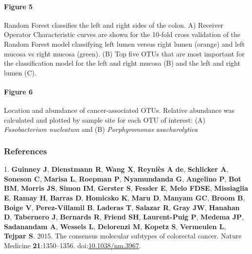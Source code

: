 \documentclass[11pt,]{article}
\let\oldparagraph\paragraph
\renewcommand{\paragraph}[1]{\oldparagraph{#1}\mbox{}}
\begin{document}
\newpage

\paragraph{Figure 5}\label{figure-5}

Random Forest classifies the left and right sides of the colon. A)
Receiver Operator Characteristic curves are shown for the 10-fold cross
validation of the Random Forest model classifying left lumen versus
right lumen (orange) and left mucosa vs right mucosa (green). (B) Top
five OTUs that are most important for the classification model for the
left and right mucosa (B) and the left and right lumen (C).

\newpage

\paragraph{Figure 6}\label{figure-6}

Location and abundance of cancer-associated OTUs. Relative abundance was
calculated and plotted by sample site for each OTU of interest: (A)
\emph{Fusobacterium nucleatum} and (B) \emph{Porphyromonas
asacharolytica}

\subsubsection*{References}\label{references}

\hypertarget{refs}{}
\hypertarget{ref-Guinney2015}{}
1. \textbf{Guinney J}, \textbf{Dienstmann R}, \textbf{Wang X},
\textbf{Reyniès A de}, \textbf{Schlicker A}, \textbf{Soneson C},
\textbf{Marisa L}, \textbf{Roepman P}, \textbf{Nyamundanda G},
\textbf{Angelino P}, \textbf{Bot BM}, \textbf{Morris JS}, \textbf{Simon
IM}, \textbf{Gerster S}, \textbf{Fessler E}, \textbf{Melo FDSE},
\textbf{Missiaglia E}, \textbf{Ramay H}, \textbf{Barras D},
\textbf{Homicsko K}, \textbf{Maru D}, \textbf{Manyam GC}, \textbf{Broom
B}, \textbf{Boige V}, \textbf{Perez-Villamil B}, \textbf{Laderas T},
\textbf{Salazar R}, \textbf{Gray JW}, \textbf{Hanahan D},
\textbf{Tabernero J}, \textbf{Bernards R}, \textbf{Friend SH},
\textbf{Laurent-Puig P}, \textbf{Medema JP}, \textbf{Sadanandam A},
\textbf{Wessels L}, \textbf{Delorenzi M}, \textbf{Kopetz S},
\textbf{Vermeulen L}, \textbf{Tejpar S}. 2015. The consensus molecular
subtypes of colorectal cancer. Nature Medicine \textbf{21}:1350--1356.
doi:\href{https://doi.org/10.1038/nm.3967}{10.1038/nm.3967}.
\end{document}
